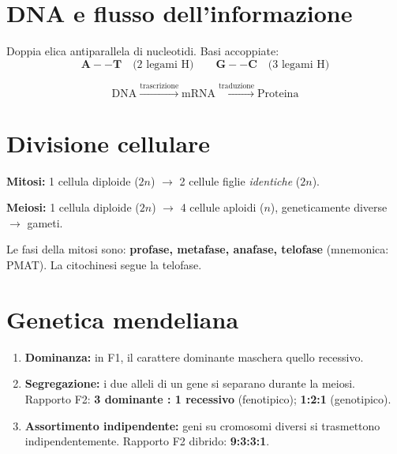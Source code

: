\documentclass[12pt, a4paper, twoside, openright]{book}
\theoremstyle{definition}
\begin{document}
\section{DNA e flusso dell'informazione}

\begin{defbox}
Doppia elica antiparallela di nucleotidi. Basi accoppiate:
\[
\textbf{A}--\textbf{T} \quad \text{(2 legami H)} \qquad \textbf{G}--\textbf{C} \quad \text{(3 legami H)}
\]
\end{defbox}

\begin{defbox}
\[
\text{DNA} \xrightarrow{\text{trascrizione}} \text{mRNA} \xrightarrow{\text{traduzione}} \text{Proteina}
\]
\end{defbox}

\section{Divisione cellulare}

\begin{formulario}
\textbf{Mitosi:} 1 cellula diploide ($2n$) $\to$ 2 cellule figlie \emph{identiche} ($2n$).

\textbf{Meiosi:} 1 cellula diploide ($2n$) $\to$ 4 cellule aploidi ($n$), geneticamente diverse $\to$ gameti.
\end{formulario}

\begin{attenzione}
Le fasi della mitosi sono: \textbf{profase, metafase, anafase, telofase} (mnemonica: PMAT). La citochinesi segue la telofase.
\end{attenzione}

\section{Genetica mendeliana}

\begin{defbox}
\begin{enumerate}
  \item \textbf{Dominanza:} in F1, il carattere dominante maschera quello recessivo.
  \item \textbf{Segregazione:} i due alleli di un gene si separano durante la meiosi. Rapporto F2: \textbf{3 dominante : 1 recessivo} (fenotipico); \textbf{1:2:1} (genotipico).
  \item \textbf{Assortimento indipendente:} geni su cromosomi diversi si trasmettono indipendentemente. Rapporto F2 dibrido: \textbf{9:3:3:1}.
\end{enumerate}
\end{defbox}
\end{document}
